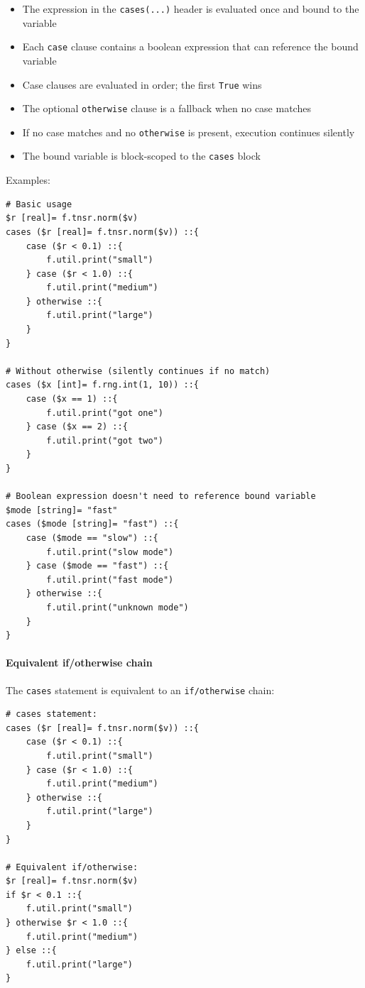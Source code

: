 \begin{itemize}
\item The expression in the \texttt{cases(...)} header is evaluated once and bound to the variable
\item Each \texttt{case} clause contains a boolean expression that can reference the bound variable
\item Case clauses are evaluated in order; the first \texttt{True} wins
\item The optional \texttt{otherwise} clause is a fallback when no case matches
\item If no case matches and no \texttt{otherwise} is present, execution continues silently
\item The bound variable is block-scoped to the \texttt{cases} block
\end{itemize}

Examples:
\begin{verbatim}
# Basic usage
$r [real]= f.tnsr.norm($v)
cases ($r [real]= f.tnsr.norm($v)) ::{
    case ($r < 0.1) ::{
        f.util.print("small")
    } case ($r < 1.0) ::{
        f.util.print("medium")
    } otherwise ::{
        f.util.print("large")
    }
}

# Without otherwise (silently continues if no match)
cases ($x [int]= f.rng.int(1, 10)) ::{
    case ($x == 1) ::{
        f.util.print("got one")
    } case ($x == 2) ::{
        f.util.print("got two")
    }
}

# Boolean expression doesn't need to reference bound variable
$mode [string]= "fast"
cases ($mode [string]= "fast") ::{
    case ($mode == "slow") ::{
        f.util.print("slow mode")
    } case ($mode == "fast") ::{
        f.util.print("fast mode")
    } otherwise ::{
        f.util.print("unknown mode")
    }
}
\end{verbatim}

\paragraph{Equivalent if/otherwise chain}
The \texttt{cases} statement is equivalent to an \texttt{if/otherwise} chain:
\begin{verbatim}
# cases statement:
cases ($r [real]= f.tnsr.norm($v)) ::{
    case ($r < 0.1) ::{
        f.util.print("small")
    } case ($r < 1.0) ::{
        f.util.print("medium")
    } otherwise ::{
        f.util.print("large")
    }
}

# Equivalent if/otherwise:
$r [real]= f.tnsr.norm($v)
if $r < 0.1 ::{
    f.util.print("small")
} otherwise $r < 1.0 ::{
    f.util.print("medium")
} else ::{
    f.util.print("large")
}
\end{verbatim}

